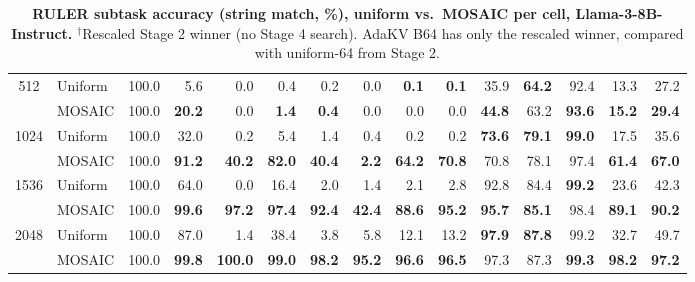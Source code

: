 \begin{table}[tp]
\begin{tabular}{@{} c l rrrrrrrrrrrrr @{}}
    \multirow{2}{*}{512} & Uniform & 100.0 & 5.6 & 0.0 & 0.4 & 0.2 & 0.0 & \textbf{0.1} & \textbf{0.1} & 35.9 & \textbf{64.2} & 92.4 & 13.3 & 27.2 \\
     & MOSAIC & 100.0 & \textbf{20.2} & 0.0 & \textbf{1.4} & \textbf{0.4} & 0.0 & 0.0 & 0.0 & \textbf{44.8} & 63.2 & \textbf{93.6} & \textbf{15.2} & \textbf{29.4} \\
    \cmidrule(l){1-15}
    \multirow{2}{*}{1024} & Uniform & 100.0 & 32.0 & 0.2 & 5.4 & 1.4 & 0.4 & 0.2 & 0.2 & \textbf{73.6} & \textbf{79.1} & \textbf{99.0} & 17.5 & 35.6 \\
     & MOSAIC & 100.0 & \textbf{91.2} & \textbf{40.2} & \textbf{82.0} & \textbf{40.4} & \textbf{2.2} & \textbf{64.2} & \textbf{70.8} & 70.8 & 78.1 & 97.4 & \textbf{61.4} & \textbf{67.0} \\
    \cmidrule(l){1-15}
    \multirow{2}{*}{1536} & Uniform & 100.0 & 64.0 & 0.0 & 16.4 & 2.0 & 1.4 & 2.1 & 2.8 & 92.8 & 84.4 & \textbf{99.2} & 23.6 & 42.3 \\
     & MOSAIC & 100.0 & \textbf{99.6} & \textbf{97.2} & \textbf{97.4} & \textbf{92.4} & \textbf{42.4} & \textbf{88.6} & \textbf{95.2} & \textbf{95.7} & \textbf{85.1} & 98.4 & \textbf{89.1} & \textbf{90.2} \\
    \cmidrule(l){1-15}
    \multirow{2}{*}{2048} & Uniform & 100.0 & 87.0 & 1.4 & 38.4 & 3.8 & 5.8 & 12.1 & 13.2 & \textbf{97.9} & \textbf{87.8} & 99.2 & 32.7 & 49.7 \\
     & MOSAIC & 100.0 & \textbf{99.8} & \textbf{100.0} & \textbf{99.0} & \textbf{98.2} & \textbf{95.2} & \textbf{96.6} & \textbf{96.5} & 97.3 & 87.3 & \textbf{99.3} & \textbf{98.2} & \textbf{97.2} \\
    \bottomrule
  \end{tabular}
  \caption{\textbf{RULER subtask accuracy (string match, \%), uniform vs.\ MOSAIC per cell, Llama-3-8B-Instruct.} $^\dagger$Rescaled Stage 2 winner (no Stage 4 search). AdaKV B64 has only the rescaled winner, compared with uniform-64 from Stage 2.}
  \label{tab:app-ruler}
\end{table}

